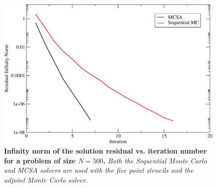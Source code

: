 \begin{figure}[t!]
  \centering
  \includegraphics[width=6in,clip]{chapters/mc_background/seq_conv_500.pdf}
  \caption{\textbf{Infinity norm of the solution residual
      vs. iteration number for a problem of size $N=500$.}
    \textit{Both the Sequential Monte Carlo and MCSA solvers are used
      with the five point stencils and the adjoint Monte Carlo
      solver.}}
  \label{fig:seq_500}
\end{figure}

\clearpage

